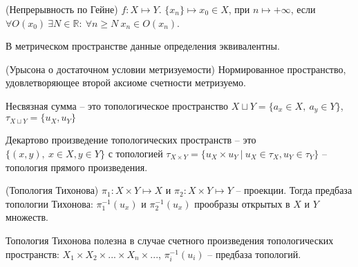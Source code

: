 \begin{definition}
    (Непрерывность по Гейне) $f: X \mapsto Y$. $\{x_n\} \mapsto x_0 \in X$, при $n \mapsto +\infty$, если $\forall O(x_0)\ \exists N \in \mathbb{R}:\ \forall n \geq N\ x_n \in O(x_n)$.
\end{definition}

\begin{theorem}
    В метрическом пространстве данные определения эквивалентны.
\end{theorem}

\begin{theorem}
    (Урысона о достаточном условии метризуемости) Нормированное пространство, удовлетворяющее второй аксиоме счетности метризуемо.
\end{theorem}

\begin{definition}
    Несвязная сумма -- это топологическое пространство $X \sqcup Y = \{a_x \in X,\ a_y \in Y\}$, $\tau_{X \sqcup Y} = \{u_X, u_Y\}$  
\end{definition}

\begin{definition}
    Декартово произведение топологических пространств -- это $\{(x, y),\ x \in X, y\in Y\}$ с топологией $\tau_{X \times Y} = \{u_X \times u_Y\ |\ u_X \in \tau_X, u_Y \in \tau_Y\}$ -- топология прямого произведения.
\end{definition}

\begin{definition}
    (Топология Тихонова) $\pi_1:X\times Y \mapsto X$ и $\pi_2:X\times Y \mapsto Y$ -- проекции. Тогда предбаза топологии Тихонова: $\pi_1^{-1}(u_x)$ и $\pi_2^{-1}(u_x)$ прообразы открытых в $X$ и $Y$ множеств. 
\end{definition}

\begin{nota_bene}
    Топология Тихонова полезна в случае счетного произведения топологических пространств: $X_1 \times X_2 \times ... \times X_n \times ...$, $\pi_i^{-1}(u_i)$ -- предбаза топологий.
\end{nota_bene}